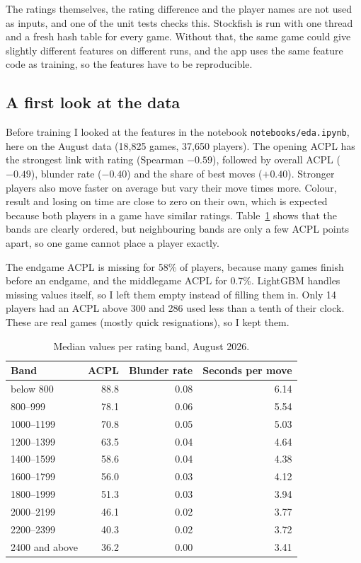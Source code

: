 \documentclass[11pt,a4paper]{article}
\begin{document}
The ratings themselves, the rating difference and the player names are not used as inputs, and
one of the unit tests checks this. Stockfish is run with one thread and a fresh hash table for
every game. Without that, the same game could give slightly different features on different runs,
and the app uses the same feature code as training, so the features have to be reproducible.

\subsection*{A first look at the data}

Before training I looked at the features in the notebook \texttt{notebooks/eda.ipynb}, here on the
August data (18,825 games, 37,650 players). The opening ACPL has the strongest link with rating
(Spearman $-0.59$), followed by overall ACPL ($-0.49$), blunder rate ($-0.40$) and the share of
best moves ($+0.40$). Stronger players also move faster on average but vary their move times more.
Colour, result and losing on time are close to zero on their own, which is expected because both
players in a game have similar ratings. Table~\ref{tab:eda} shows that the bands are clearly ordered,
but neighbouring bands are only a few ACPL points apart, so one game cannot place a player exactly.

The endgame ACPL is missing for 58\% of players, because many games finish before an endgame, and
the middlegame ACPL for 0.7\%. LightGBM handles missing values itself, so I left them empty instead
of filling them in. Only 14 players had an ACPL above 300 and 286 used less than a tenth of their
clock. These are real games (mostly quick resignations), so I kept them.

\begin{table}[H]
\centering
\caption{Median values per rating band, August 2026.}
\label{tab:eda}
\begin{tabular}{lrrr}
\toprule
Band & ACPL & Blunder rate & Seconds per move \\
\midrule
below 800 & 88.8 & 0.08 & 6.14 \\
800--999 & 78.1 & 0.06 & 5.54 \\
1000--1199 & 70.8 & 0.05 & 5.03 \\
1200--1399 & 63.5 & 0.04 & 4.64 \\
1400--1599 & 58.6 & 0.04 & 4.38 \\
1600--1799 & 56.0 & 0.03 & 4.12 \\
1800--1999 & 51.3 & 0.03 & 3.94 \\
2000--2199 & 46.1 & 0.02 & 3.77 \\
2200--2399 & 40.3 & 0.02 & 3.72 \\
2400 and above & 36.2 & 0.00 & 3.41 \\
\bottomrule
\end{tabular}
\end{table}
\end{document}
